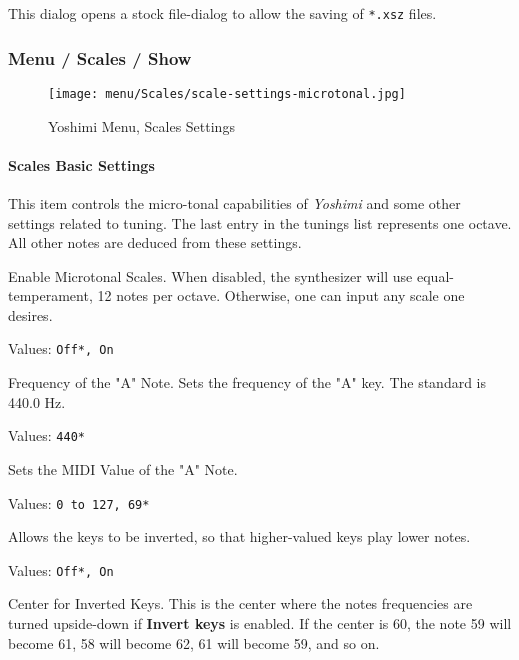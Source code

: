    This dialog opens a stock file-dialog to allow the saving of
   \texttt{*.xsz} files.

\subsubsection{Menu / Scales / Show}
\label{subsec:menu_scales_show}

\begin{figure}[H]
   \centering 
   \texttt{[image: menu/Scales/scale-settings-microtonal.jpg]}
   \caption{Yoshimi Menu, Scales Settings}
   \label{fig:yoshimi_menu_scales_settings}
\end{figure}

\paragraph{Scales Basic Settings}
\label{paragraph:menu_scales_basic_settings}

   This item controls the micro-tonal capabilities of \textsl{Yoshimi} and
   some other settings related to tuning. 
   The last entry in the tunings list represents one octave.
   All other notes are deduced from these settings.

   \setcounter{ItemCounter}{0}      %

   Enable Microtonal Scales.
   When disabled, the synthesizer will use equal-temperament, 12 notes per
   octave.  Otherwise, one can input any scale one desires.

   Values: \texttt{Off*, On}

   Frequency of the "A" Note.
   Sets the frequency of the "A" key. The standard is 440.0 Hz.

   Values: \texttt{440*}

   Sets the MIDI Value of the "A" Note.

   Values: \texttt{0 to 127, 69*}

   Allows the keys to be inverted, so that higher-valued keys play lower
   notes.

   Values: \texttt{Off*, On}

   Center for Inverted Keys.
   This is the center where the notes frequencies are turned upside-down if
   \textbf{Invert keys} is enabled.
   If the center is 60, the note 59 will become 61, 58 will become 62, 61
   will become 59, and so on.

